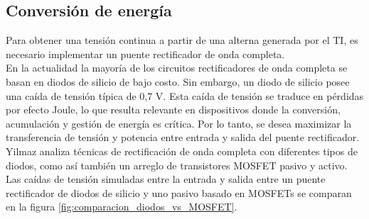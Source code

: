 \subsection{Conversión de energía}
Para obtener una tensión continua a partir de una alterna generada por el TI, es necesario implementar un puente rectificador de onda completa.\\
En la actualidad la mayoría de los circuitos rectificadores de onda completa se basan en diodos de silicio de bajo costo. Sin embargo, un diodo de silicio posee una caída de tensión típica de 0,7 V. Esta caída de tensión se traduce en pérdidas por efecto Joule, lo que resulta relevante en dispositivos donde la conversión, acumulación y gestión de energía es crítica. Por lo tanto, se desea maximizar la transferencia de tensión y potencia entre entrada y salida del puente rectificador.\\
Yilmaz \citep{Yilmaz} analiza técnicas de rectificación de onda completa con diferentes tipos de diodos, como así también un arreglo de transistores MOSFET pasivo y activo. Las caídas de tensión simuladas entre la entrada y salida entre un puente rectificador de diodos de silicio y uno pasivo basado en MOSFETs se comparan en la figura \ref{fig:comparacion_diodos_vs_MOSFET}.\\

